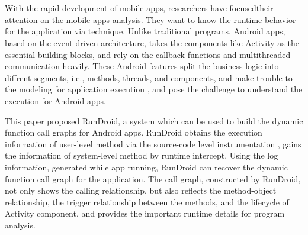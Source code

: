 \newpage

\vspace{-500pt}

\chapter*{}




With the rapid development of mobile apps, researchers have focusedtheir attention on the mobile apps analysis.
They want to know the runtime behavior for the application via technique.
Unlike traditional programs, Android apps, based on the  event-driven architecture,  takes the components like Activity as  the essential building blocks, and  rely on the callback functions and multithreaded communication heavily.
These Android features split the business logic into diffrent segments, i.e., methods, threads, and components,  and make trouble to the modeling for application execution , and  pose the challenge to understand the execution for Android apps.





This paper proposed  RunDroid, a system which can be used to build the dynamic function call graphs for Android apps.
RunDroid obtains  the execution information of user-level method via  the source-code level instrumentation ,
gains the information of system-level method by runtime intercept.
Using the log information, generated while app running, RunDroid can recover the dynamic function call graph for the application.
The call graph, constructed by RunDroid, not only shows the calling relationship, but also reflects the method-object relationship, the trigger relationship between the methods, and the lifecycle of  Activity component, 
and provides the important runtime details for program analysis.





